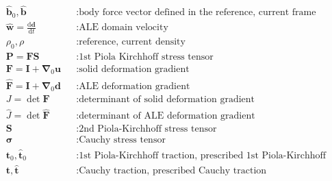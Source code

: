 \documentclass[a4paper,12pt]{report}
\newcommand{\bs}[1]{\boldsymbol{#1}}
\begin{document}
\begin{equation}
\begin{aligned}
&\hat{\bs{b}}_0, \hat{\bs{b}} &&: \text{body force vector defined in the reference, current frame} \\
&\widehat{\bs{w}}=\frac{\mathrm{d}\bs{d}}{\mathrm{d}t} &&: \text{ALE domain velocity} \\
&\rho_0, \rho &&: \text{reference, current density} \\
&\bs{P}=\bs{F}\bs{S} &&: \text{1st Piola Kirchhoff stress tensor} \\
&\bs{F}=\bs{I}+\bs{\nabla}_{0}\bs{u} &&: \text{solid deformation gradient} \\
&\widehat{\bs{F}}=\bs{I}+\bs{\nabla}_{0}\bs{d} &&: \text{ALE deformation gradient} \\
&J=\det \bs{F} &&: \text{determinant of solid deformation gradient} \\
&\widehat{J}=\det \widehat{\bs{F}} &&: \text{determinant of ALE deformation gradient} \\
&\bs{S} &&: \text{2nd Piola-Kirchhoff stress tensor} \\
&\bs{\sigma} &&: \text{Cauchy stress tensor} \\
&\bs{t}_0, \hat{\bs{t}}_{0} &&: \text{1st Piola-Kirchhoff traction, prescribed 1st Piola-Kirchhoff traction} \\
&\bs{t}, \hat{\bs{t}} &&: \text{Cauchy traction, prescribed Cauchy traction} \\
\end{aligned}
\end{equation}

\newpage

\end{document}
